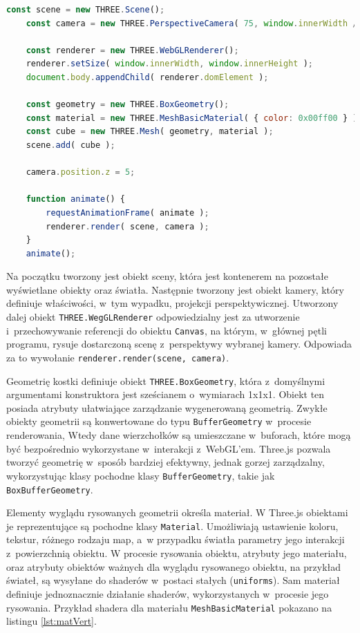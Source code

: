 \begin{lstlisting}[language=javascript, label={lst:threejs:base}, caption={Hello World w~świecie grafiki 3D}]
    const scene = new THREE.Scene();
    const camera = new THREE.PerspectiveCamera( 75, window.innerWidth / window.innerHeight, 0.1, 1000 );
    
    const renderer = new THREE.WebGLRenderer();
    renderer.setSize( window.innerWidth, window.innerHeight );
    document.body.appendChild( renderer.domElement );

    const geometry = new THREE.BoxGeometry();
    const material = new THREE.MeshBasicMaterial( { color: 0x00ff00 } );
    const cube = new THREE.Mesh( geometry, material );
    scene.add( cube );

    camera.position.z = 5;

    function animate() {
        requestAnimationFrame( animate );
        renderer.render( scene, camera );
    }
    animate();
\end{lstlisting}

Na początku tworzony jest obiekt sceny, która jest kontenerem na pozostałe wyświetlane obiekty oraz światła. Następnie tworzony jest obiekt kamery, który definiuje właściwości, w~tym wypadku, projekcji perspektywicznej. Utworzony dalej obiekt \texttt{THREE.WegGLRenderer} odpowiedzialny jest za utworzenie i~przechowywanie referencji do obiektu \texttt{Canvas}, na którym, w~głównej pętli programu, rysuje dostarczoną scenę z~perspektywy wybranej kamery. Odpowiada za to wywołanie \texttt{renderer.render(scene, camera)}.

Geometrię kostki definiuje obiekt \texttt{THREE.BoxGeometry}, która z~domyślnymi argumentami konstruktora jest sześcianem o~wymiarach 1x1x1. Obiekt ten posiada atrybuty ułatwiające zarządzanie wygenerowaną geometrią. Zwykłe obiekty geometrii są konwertowane do typu \texttt{BufferGeometry} w~procesie renderowania, Wtedy dane wierzchołków są umieszczane w~buforach, które mogą być bezpośrednio wykorzystane w~interakcji z~WebGL'em. Three.js pozwala tworzyć geometrię w~sposób bardziej efektywny, jednak gorzej zarządzalny, wykorzystując klasy pochodne klasy \texttt{BufferGeometry}, takie jak \texttt{BoxBufferGeometry}.

Elementy wyglądu rysowanych geometrii określa materiał. W Three.js obiektami je reprezentujące są pochodne klasy \texttt{Material}. Umożliwiają ustawienie koloru, tekstur, różnego rodzaju map, a~w przypadku światła parametry jego interakcji z~powierzchnią obiektu. W procesie rysowania obiektu, atrybuty jego materiału, oraz atrybuty obiektów ważnych dla wyglądu rysowanego obiektu, na przykład świateł, są wysyłane do shaderów w~postaci stałych (\texttt{uniforms}). Sam materiał definiuje jednoznacznie działanie shaderów, wykorzystanych w~procesie jego rysowania. Przykład shadera dla materiału \texttt{MeshBasicMaterial} pokazano na listingu \ref{lst:matVert}.

